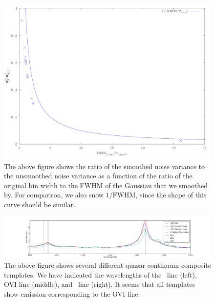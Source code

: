 \documentclass[11pt]{article}
\begin{document}
\begin{figure}[h]
  \centering
  \includegraphics[width=14cm]{NoisePlot.png}
  \caption{The above figure shows the ratio of the smoothed noise variance to the unsmoothed noise variance as a function of the ratio of the original bin width to the FWHM of the Gaussian that we smoothed by. For comparison, we also snow $1/\text{FWHM}$, since the shape of this curve should be similar. }
  \label{fig:todo}
\end{figure}

\begin{figure}[h]
  \centering
  \includegraphics[width=18cm]{CompareTemplates.png}
  \caption{The above figure shows several different quasar continuum composite templates. We have indicated the wavelengths of the \lyb\ line (left), OVI line (middle), and \lya\ line (right). It seems that all templates show emission corresponding to the OVI line.}
  \label{fig:todo}
\end{figure}
\end{document}
